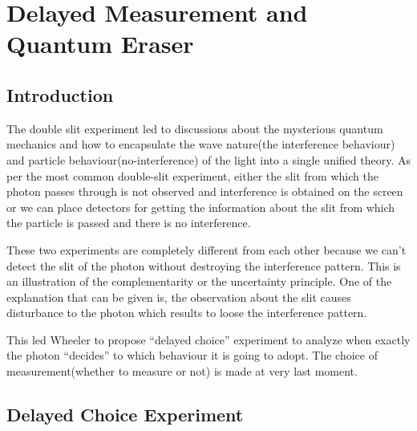 \chapter{Delayed Measurement and Quantum Eraser}
\section{Introduction}
    The double slit experiment led to discussions about the mysterious quantum mechanics and how to encapsulate the wave nature(the interference behaviour) and particle behaviour(no-interference) of the light into a single unified theory. As per the most common double-slit experiment, either the slit from which the photon passes through is not observed and interference is obtained on the screen or we can place detectors for getting the information about the slit from which the particle is passed and there is no interference. \\ \par
    These two experiments are completely different from each other because we can't detect the slit of the photon without destroying the interference pattern. This is an illustration of the complementarity or the uncertainty principle.
    One of the explanation that can be given is, the observation about the slit causes disturbance to the photon which results to loose the interference pattern. \\ \par
    This led Wheeler to propose ``delayed choice'' experiment to analyze when exactly the photon ``decides'' to which behaviour it is going to adopt. The choice of measurement(whether to measure or not) is made at very last moment.
\section{Delayed Choice Experiment}
